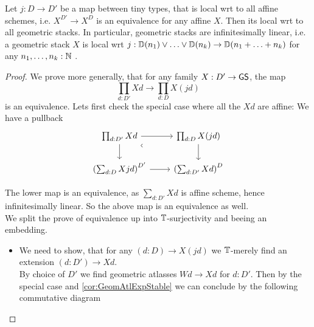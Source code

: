 \begin{prop}
	Let $j : D \to D'$ be a map between tiny types, that is local wrt to all affine schemes, i.e. $X ^ {D'} \to X ^D$ is an equivalence for any affine $X$. Then its local wrt to all geometric stacks.
	In particular, geometric stacks are infinitesimally linear, i.e. a geometric stack $X$ is local wrt $j : \mathbb{D}(n_1) \lor \hdots \lor \mathbb{D}(n_k) \to \mathbb{D}(n_1+ \hdots + n_k)$ for any $n_1,\hdots,n_k : \mathbb{N}$ .
\end{prop}
\begin{proof}
We prove more generally, that for any family $X :D' \to \mathsf{GS}$, the map
\[
\prod_{d:D'} X d \to \prod_{d:D} X (j d) \tag{$\star$}
\]
is an equivalence. Lets first check the special case where all the $X d$ are affine: We have a pullback
\[\begin{tikzcd}
	{\prod_{d:D'} X d } & {\prod_{d:D} X (j d) } \\
	{\left (\sum_{d:D}X j d \right)^{D'}} & {\left (\sum_{d:D'} X d \right)^{D}}
	\arrow[from=1-1, to=1-2]
	\arrow[from=1-1, to=2-1]
	\arrow["\ulcorner"{anchor=center, pos=0.125, rotate=45}, draw=none, from=1-1, to=2-2]
	\arrow[from=1-2, to=2-2]
	\arrow[from=2-1, to=2-2]
\end{tikzcd}\]

The lower map is an equivalence, as $\sum_{d :D'} X d$ is affine scheme, hence infinitesimally linear. So the above map is an equivalence as well. \\
We split the prove of equivalence up into $\mathbb{T}$-surjectivity and beeing an embedding.
\begin{itemize}
	\item
We need to show, that for any $(d : D) \to X (j d)$ we $\mathbb{T}$-merely find an extension $(d :D') \to X d$. \\
By choice of $D'$ we find geometric atlasses $W d \to X d$ for $d :D'$.
Then by the special case and \ref{cor:GeomAtlExpStable} we can conclude by the following commutative diagram


\end{itemize}
\end{proof}
